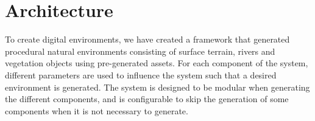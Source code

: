 \section{Architecture}
To create digital environments, we have created a framework that generated procedural natural environments consisting of surface terrain, rivers and vegetation objects using pre-generated assets. For each component of the system, different parameters are used to influence the system such that a desired environment is generated. The system is designed to be modular when generating the different components, and is configurable to skip the generation of some components when it is not necessary to generate. 





